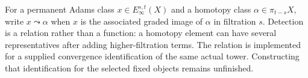 \begin{definition}
  \label{def:adams-detection}
  \notready
  For a permanent Adams class $x\in E_\infty^{s,t}(X)$ and a homotopy class
  $\alpha\in\pi_{t-s}X$, write $x\leadsto\alpha$ when $x$ is the associated
  graded image of $\alpha$ in filtration $s$.  Detection is a relation rather
  than a function: a homotopy element can have several representatives after
  adding higher-filtration terms.
  The relation is implemented for a supplied convergence identification
  of the same actual tower. Constructing that identification for the
  selected fixed objects remains unfinished.
\end{definition}
